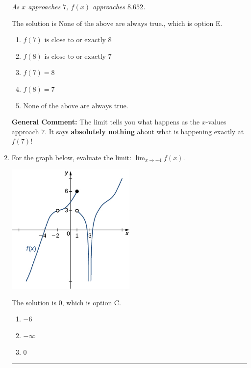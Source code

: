 \documentclass{extbook}[14pt]
\newcommand{\litem}[1]{\item #1

\rule{\textwidth}{0.4pt}}
\begin{document}
\begin{enumerate}
{\begin{center}
    \textit{ As $x$ approaches $7$, $f(x)$ approaches $8.652$. }
\end{center}
The solution is \( \text{None of the above are always true.} \), which is option E.\begin{enumerate}[label=\Alph*.]
\item \( f(7) \text{ is close to or exactly } 8 \)


\item \( f(8) \text{ is close to or exactly } 7 \)


\item \( f(7) = 8 \)


\item \( f(8) = 7 \)


\item \( \text{None of the above are always true.} \)


\end{enumerate}

\textbf{General Comment:} The limit tells you what happens as the $x$-values approach $7$. It says \textbf{absolutely nothing} about what is happening exactly at $f(7)$!
}
\litem{
For the graph below, evaluate the limit: $ \displaystyle \lim_{x \rightarrow -4} f(x)$.

\begin{center}
    \includegraphics[width=0.5\textwidth]{../Figures/evaluateLimitGraphicallyA.png}
\end{center}


The solution is \( 0 \), which is option C.\begin{enumerate}[label=\Alph*.]
\item \( -6 \)


\item \( -\infty \)


\item \( 0 \)



\end{enumerate}}
\end{enumerate}
\end{document}
